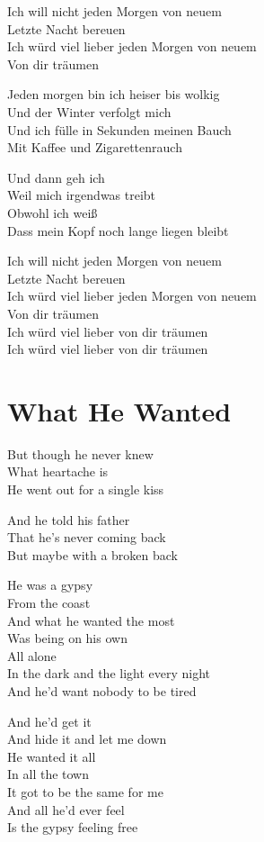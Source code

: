 \documentclass[]{book}
\begin{document}
Ich will nicht jeden Morgen von neuem\\
Letzte Nacht bereuen\\
Ich würd viel lieber jeden Morgen von neuem\\
Von dir träumen

Jeden morgen bin ich heiser bis wolkig\\
Und der Winter verfolgt mich\\
Und ich fülle in Sekunden meinen Bauch\\
Mit Kaffee und Zigarettenrauch

Und dann geh ich\\
Weil mich irgendwas treibt\\
Obwohl ich weiß\\
Dass mein Kopf noch lange liegen bleibt

Ich will nicht jeden Morgen von neuem\\
Letzte Nacht bereuen\\
Ich würd viel lieber jeden Morgen von neuem\\
Von dir träumen\\
Ich würd viel lieber von dir träumen\\
Ich würd viel lieber von dir träumen

\hypertarget{what-he-wanted}{%
\section{What He Wanted}\label{what-he-wanted}}

But though he never knew\\
What heartache is\\
He went out for a single kiss

And he told his father\\
That he's never coming back\\
But maybe with a broken back

He was a gypsy\\
From the coast\\
And what he wanted the most\\
Was being on his own\\
All alone\\
In the dark and the light every night\\
And he'd want nobody to be tired

And he'd get it\\
And hide it and let me down\\
He wanted it all\\
In all the town\\
It got to be the same for me\\
And all he'd ever feel\\
Is the gypsy feeling free
\end{document}
